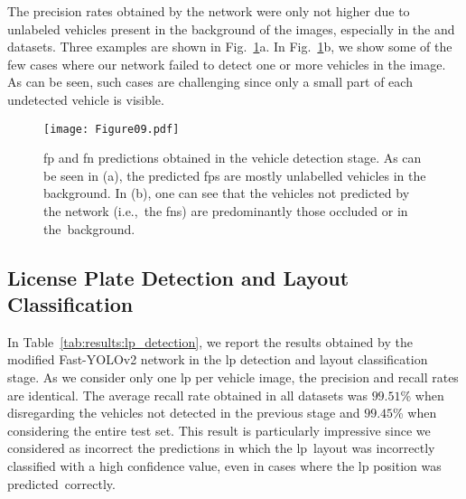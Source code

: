 The precision rates obtained by the network were only not higher due to unlabeled vehicles present in the background of the images, especially in the \aolp and \ssig datasets. 
Three examples are shown in Fig.~\ref{fig:results:vehicle_detection_fps_fns}a.
In Fig.~\ref{fig:results:vehicle_detection_fps_fns}b, we show some of the few cases where our network failed to detect one or more vehicles in the image. 
As can be seen, such cases are challenging since only a small part of each undetected vehicle is visible.

\begin{figure}[!htb]
    \centering
    
    \texttt{[image: Figure09.pdf]}
    
    \vspace{-2mm}
    
    \caption{\gls*{fp} and \gls*{fn} predictions obtained in the vehicle detection stage. As can be seen in (a), the predicted \glspl*{fp} are mostly unlabelled vehicles in the background. In (b), one can see that the vehicles not predicted by the network (i.e.,~the \glspl*{fn}) are predominantly those occluded or in the~background.}
    \label{fig:results:vehicle_detection_fps_fns}
\end{figure}

\subsection{License Plate Detection and Layout Classification}
\label{sec:results:lp_detection}

In Table~\ref{tab:results:lp_detection}, we report the results obtained by the modified Fast-YOLOv2 network in the \gls*{lp} detection and layout classification stage.
As we consider only one \gls*{lp} per vehicle image, the precision and recall rates are identical.
The average recall rate obtained in all datasets was $99.51$\% when disregarding the vehicles not detected in the previous stage and $99.45$\% when considering the entire test set.
This result is particularly impressive since we considered as incorrect the predictions in which the \gls*{lp}~layout was incorrectly classified with a high confidence value, even in cases where the \gls*{lp} position was predicted~correctly.

